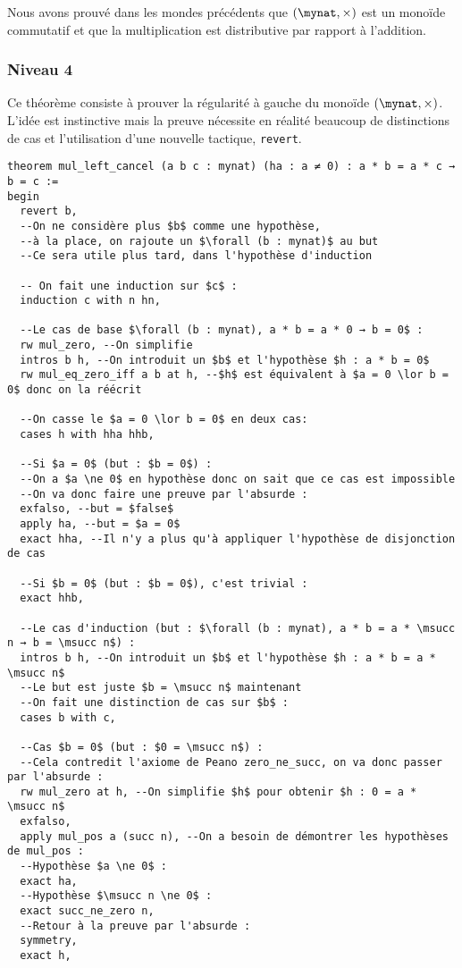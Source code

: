 Nous avons prouvé dans les mondes précédents que $(\mynat , \times )$ est un monoïde commutatif et que la multiplication est distributive par rapport à l'addition.

\subsubsection{Niveau 4}

Ce théorème consiste à prouver la régularité à gauche du monoïde $(\mynat, \times)$.
L'idée est instinctive mais la preuve nécessite en réalité beaucoup de distinctions de cas et l'utilisation d'une nouvelle tactique, \texttt{revert}.
\begin{verbatim}
theorem mul_left_cancel (a b c : mynat) (ha : a ≠ 0) : a * b = a * c → b = c :=
begin
  revert b,
  --On ne considère plus $b$ comme une hypothèse,
  --à la place, on rajoute un $\forall (b : mynat)$ au but
  --Ce sera utile plus tard, dans l'hypothèse d'induction
  
  -- On fait une induction sur $c$ :
  induction c with n hn,

  --Le cas de base $\forall (b : mynat), a * b = a * 0 → b = 0$ :
  rw mul_zero, --On simplifie
  intros b h, --On introduit un $b$ et l'hypothèse $h : a * b = 0$
  rw mul_eq_zero_iff a b at h, --$h$ est équivalent à $a = 0 \lor b = 0$ donc on la réécrit
  
  --On casse le $a = 0 \lor b = 0$ en deux cas:
  cases h with hha hhb,
  
  --Si $a = 0$ (but : $b = 0$) :
  --On a $a \ne 0$ en hypothèse donc on sait que ce cas est impossible
  --On va donc faire une preuve par l'absurde :
  exfalso, --but = $false$
  apply ha, --but = $a = 0$
  exact hha, --Il n'y a plus qu'à appliquer l'hypothèse de disjonction de cas
  
  --Si $b = 0$ (but : $b = 0$), c'est trivial :
  exact hhb,

  --Le cas d'induction (but : $\forall (b : mynat), a * b = a * \msucc n → b = \msucc n$) :
  intros b h, --On introduit un $b$ et l'hypothèse $h : a * b = a * \msucc n$
  --Le but est juste $b = \msucc n$ maintenant
  --On fait une distinction de cas sur $b$ :
  cases b with c,

  --Cas $b = 0$ (but : $0 = \msucc n$) :
  --Cela contredit l'axiome de Peano zero_ne_succ, on va donc passer par l'absurde :
  rw mul_zero at h, --On simplifie $h$ pour obtenir $h : 0 = a * \msucc n$
  exfalso,
  apply mul_pos a (succ n), --On a besoin de démontrer les hypothèses de mul_pos :
  --Hypothèse $a \ne 0$ :
  exact ha,
  --Hypothèse $\msucc n \ne 0$ :
  exact succ_ne_zero n,
  --Retour à la preuve par l'absurde :
  symmetry,
  exact h,


\end{verbatim}
